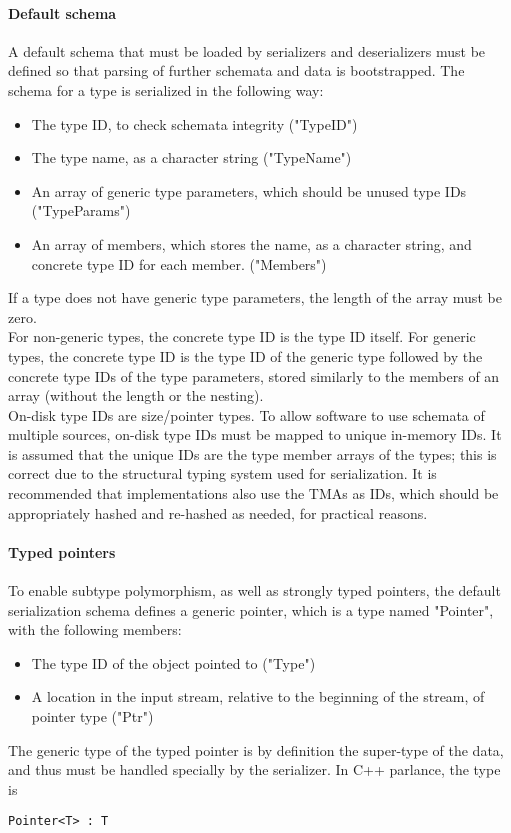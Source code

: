 \paragraph{Default schema} A default schema that must be loaded by serializers and deserializers must be defined so that parsing of further schemata and data is bootstrapped. The schema for a type is serialized in the following way:
\begin{itemize}
	\item The type ID, to check schemata integrity ("TypeID")
	\item The type name, as a character string ("TypeName")
	\item An array of generic type parameters, which should be unused type IDs ("TypeParams")
	\item An array of members, which stores the name, as a character string, and concrete type ID for each member. ("Members")
\end{itemize}
If a type does not have generic type parameters, the length of the array must be zero.\\
For non-generic types, the concrete type ID is the type ID itself. For generic types, the concrete type ID is the type ID of the generic type followed by the concrete type IDs of the type parameters, stored similarly to the members of an array (without the length or the nesting).\\
On-disk type IDs are size/pointer types. To allow software to use schemata of multiple sources, on-disk type IDs must be mapped to unique in-memory IDs. It is assumed that the unique IDs are the type member arrays of the types; this is correct due to the structural typing system used for serialization. It is recommended that implementations also use the TMAs as IDs, which should be appropriately hashed and re-hashed as needed, for practical reasons.\\
\paragraph{Typed pointers}
To enable subtype polymorphism, as well as strongly typed pointers, the default serialization schema defines a generic pointer, which is a type named "Pointer", with the following members:
\begin{itemize}
	\item The type ID of the object pointed to ("Type")
	\item A location in the input stream, relative to the beginning of the stream, of pointer type ("Ptr")
\end{itemize}
The generic type of the typed pointer is by definition the super-type of the data, and thus must be handled specially by the serializer. In C++ parlance, the type is
\begin{verbatim}
Pointer<T> : T
\end{verbatim}
